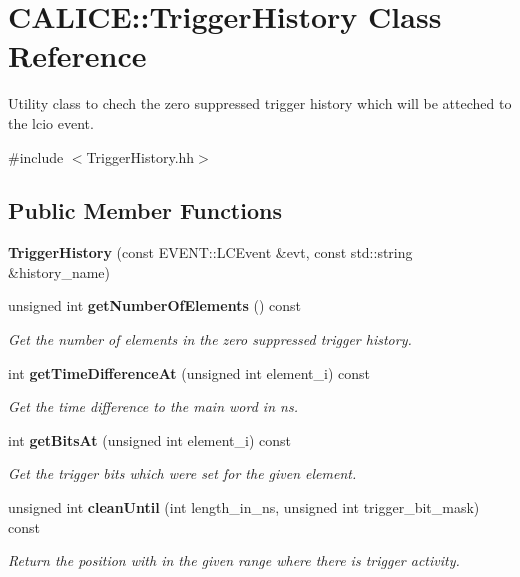 \section{CALICE::TriggerHistory Class Reference}
\label{classCALICE_1_1TriggerHistory}


Utility class to chech the zero suppressed trigger history which will be atteched to the lcio event.  


{\ttfamily \#include $<$TriggerHistory.hh$>$}\subsection*{Public Member Functions}
\begin{DoxyCompactItemize}
\item 
{\bfseries TriggerHistory} (const EVENT::LCEvent \&evt, const std::string \&history\_\-name)\label{classCALICE_1_1TriggerHistory_a0ace29a5ef70b51158c0a18cd45f5210}

\item 
unsigned int {\bf getNumberOfElements} () const \label{classCALICE_1_1TriggerHistory_a78e509a8ddba7a8dba943413a76683f5}

\begin{DoxyCompactList}\small\item\em Get the number of elements in the zero suppressed trigger history. \item\end{DoxyCompactList}\item 
int {\bf getTimeDifferenceAt} (unsigned int element\_\-i) const \label{classCALICE_1_1TriggerHistory_a7dbd50d2f2a00717b301f23612a19a70}

\begin{DoxyCompactList}\small\item\em Get the time difference to the main word in ns. \item\end{DoxyCompactList}\item 
int {\bf getBitsAt} (unsigned int element\_\-i) const \label{classCALICE_1_1TriggerHistory_a8fa2b8146acbeac095128994c81fc81f}

\begin{DoxyCompactList}\small\item\em Get the trigger bits which were set for the given element. \item\end{DoxyCompactList}\item 
unsigned int {\bf cleanUntil} (int length\_\-in\_\-ns, unsigned int trigger\_\-bit\_\-mask) const 
\begin{DoxyCompactList}\small\item\em Return the position with in the given range where there is trigger activity. \item\end{DoxyCompactList}\end{DoxyCompactItemize}
